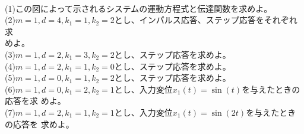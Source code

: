 \documentclass[a4paper,12pt]{article}
\begin{document}
\begin{minipage}[t]{0.35\linewidth}
\begin{center}
    \end{center}
\end{minipage}\\

\indent
(1)この図によって示されるシステムの運動方程式と伝達関数を求めよ。\\

\indent
(2)\(m=1,d=4,k_1=1,k_2=2\)とし、インパルス応答、ステップ応答をそれぞれ求\\
\indent \quad めよ。\\

\indent
(3)\(m=1,d=2,k_1=3,k_2=2\)とし、ステップ応答を求めよ。\\

\indent
(4)\(m=1,d=2,k_1=1,k_2=0\)とし、ステップ応答を求めよ。\\

\indent
(5)\(m=1,d=0,k_1=1,k_2=2\)とし、ステップ応答を求めよ。\\

\indent
(6)\(m=1,d=0,k_1=2,k_2=1\)とし、入力変位\(x_1(t)=\sin(t)\)を与えたときの応答を求
\indent \quad めよ。\\

\indent
(7)\(m=1,d=2,k_1=1,k_2=1\)とし、入力変位\(x_1(t)=\sin(2t)\)を与えたときの応答を
\indent \quad 求めよ。\\
\end{document}
